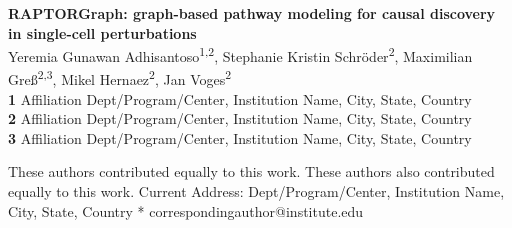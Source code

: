 \documentclass[10pt,letterpaper]{article}
\theoremstyle{definition}
\theoremstyle{remark}
\begin{document}
\vspace*{0.2in}

\begin{flushleft}
{\Large
\textbf{RAPTORGraph: graph-based pathway modeling for causal discovery in single-cell perturbations} %
}
\newline
\\
Yeremia Gunawan Adhisantoso\textsuperscript{1,2\Yinyang},
Stephanie Kristin Schr\"oder\textsuperscript{2\Yinyang},
Maximilian Gre\ss\textsuperscript{2,3\textcurrency},
Mikel Hernaez\textsuperscript{2},
Jan Voges\textsuperscript{2\ddag}
\\
\bigskip
\textbf{1} Affiliation Dept/Program/Center, Institution Name, City, State, Country
\\
\textbf{2} Affiliation Dept/Program/Center, Institution Name, City, State, Country
\\
\textbf{3} Affiliation Dept/Program/Center, Institution Name, City, State, Country
\\
\bigskip

\Yinyang These authors contributed equally to this work.
\ddag These authors also contributed equally to this work.
\textcurrency Current Address: Dept/Program/Center, Institution Name, City, State, Country
* correspondingauthor@institute.edu

\end{flushleft}

\end{document}
